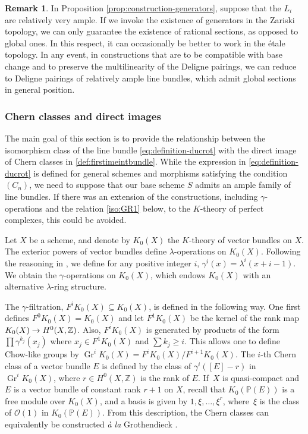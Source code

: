 \documentclass[JEP,XML,SOM,Unicode,published]{cedram}
\theoremstyle{plain}
\theoremstyle{definition}
\newtheorem{remark}[theorem]{Remark}
\newcommand{\PBbb}{\mathbb P}
\newcommand{\ZBbb}{\mathbb Z}
\newcommand{\Ocal}{\mathcal O}
\DeclareMathOperator{\Gr}{Gr}
\begin{document}
\begin{remark}
In Proposition \ref{prop:construction-generators}, suppose that the $L_{i}$ are relatively very ample. If we invoke the existence of generators in the Zariski topology, we can only guarantee the existence of rational sections, as opposed to global ones. In this respect, it can occasionally be better to work in the étale topology. In any event, in constructions that are to be compatible with base change and to preserve the multilinearity of the Deligne pairings, we can reduce to Deligne pairings of relatively ample line bundles, which admit global sections in general position.
\end{remark}

\subsubsection{Chern classes and direct images}\label{subsub:Cherndirect}

The main goal of this section is to provide the relationship between the isomorphism class of the line bundle \eqref{eq:definition-ducrot} with the direct image of Chern classes in \eqref{def:firstimeintbundle}. While the expression in \eqref{eq:definition-ducrot} is defined for general schemes and morphisms satisfying the condition $(C_n)$, we need to suppose that our base scheme $S$ admits an ample family of line bundles. If there was an extension of the constructions, including $\gamma$-operations and the relation \eqref{iso:GR1} below, to the $K$-theory of perfect complexes, this could be avoided.

Let $X$ be a scheme, and denote by $K_{0}(X)$ the $K$-theory of vector bundles on $X$. The exterior powers of vector bundles define $\lambda$-operations on $K_0(X)$. Following the reasoning in \cite[Exp.\,V, \S 3]{SGA6}, we define for any positive integer $i$, $\gamma^i(x) = \lambda^i(x+i-1)$. We obtain the $\gamma$-operations on $K_0(X)$, which endows $K_0(X)$ with an alternative $\lambda$\nobreakdash-ring structure.

The $\gamma$-filtration, $F^i K_0(X) \subseteq K_0(X)$, is defined in the following way. One first defines \hbox{$F^0 K_0(X) =K_0(X)$} and let $F^1 K_0(X)$ be the kernel of the rank map $K_0(X) \to\nobreak H^0(X, \mathbb{Z})$. Also, $F^i K_0(X)$ is generated by products of the form $\prod \gamma^{k_j}(x_j)$ where $x_j \in F^1 K_0(X)$ and $\sum k_j \geq i$. This allows one to define Chow-like groups by $\Gr^i K_0(X) = F^i K_0(X)/F^{i+1}K_0(X)$. The $i$-th Chern class of a vector bundle $E$ is defined by the class of $\gamma^{i}([E]-r)$ in $\Gr^i K_0(X)$, where $r \in H^0(X, \ZBbb)$ is the rank of $E$. If~$X$ is quasi-compact and $E$ is a vector bundle of constant rank $r+1$ on $X$, recall that $K_{0}(\PBbb(E))$ is a free module over $K_{0}(X)$, and a basis is given by $1,\xi,\ldots, \xi^{r}$, where~$\xi$ is the class of $\Ocal(1)$ in $K_{0}(\PBbb(E))$. From this description, the Chern classes can equivalently be constructed \emph{à la} Grothendieck \cite[Exp.\,VI, \S 5]{SGA6}.
\end{document}
